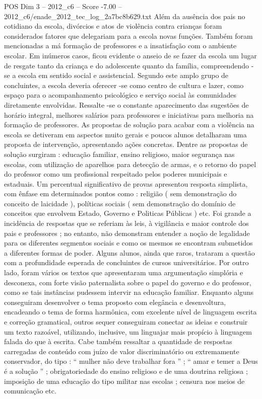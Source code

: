 \begin{textsample}{POS Dim 3 – 2012\_c6 – Score -7.00 – 2012\_c6/enade\_2012\_tec\_log\_2a7bc8b629.txt}
Além da ausência dos pais no cotidiano da escola, divórcios e atos de violência contra crianças foram considerados fatores que delegariam para a escola novas funções.
Também foram mencionadas a má formação de professores e a insatisfação com o ambiente escolar.
Em inúmeros casos, ficou evidente o anseio de se fazer da escola um lugar de resgate tanto da criança e do adolescente quanto da família, compreendendo -se a escola em sentido social e assistencial.
Segundo este amplo grupo de concluintes, a escola deveria oferecer -se como centro de cultura e lazer, como espaço para o acompanhamento psicológico e serviço social às comunidades diretamente envolvidas.
Ressalte -se o constante aparecimento das sugestões de horário integral, melhores salários para professores e iniciativas para melhoria na formação de professores.
As propostas de solução para acabar com a violência na escola se detiveram em aspectos muito gerais e poucos alunos detalharam uma proposta de intervenção, apresentando ações concretas.
Dentre as propostas de solução surgiram : educação familiar, ensino religioso, maior segurança nas escolas, com utilização de aparelhos para detecção de armas, e o retorno do papel do professor como um profissional respeitado pelos poderes municipais e estaduais.
Um percentual significativo de provas apresentou resposta simplista, com ênfase em determinados pontos como : religião ( sem demonstração do conceito de laicidade ), políticas sociais ( sem demonstração do domínio de conceitos que envolvem Estado, Governo e Politicas Públicas ) etc.
Foi grande a incidência de respostas que se referiam às leis, à vigilância e maior controle dos pais e professores ; no entanto, não demonstram entender a noção de legalidade para os diferentes segmentos sociais e como os mesmos se encontram submetidos a diferentes formas de poder.
Alguns alunos, ainda que raros, trataram a questão com a profundidade esperada de concluintes de cursos universitários.
Por outro lado, foram vários os textos que apresentaram uma argumentação simplória e desconexa, com forte visão paternalista sobre o papel do governo e do professor, como se tais instâncias pudessem intervir na educação familiar.
Enquanto alguns conseguiram desenvolver o tema proposto com elegância e desenvoltura, encadeando o tema de forma harmônica, com excelente nível de linguagem escrita e correção gramatical, outros sequer conseguiram conectar as ideias e construir um texto razoável, utilizando, inclusive, um linguajar mais propício à linguagem falada do que à escrita.
Cabe também ressaltar a quantidade de respostas carregadas de conteúdo com juízo de valor discriminatório ou extremamente conservador, do tipo : “ mulher não deve trabalhar fora ” ; “ amar e temer a Deus é a solução ” ; obrigatoriedade do ensino religioso e de uma doutrina religiosa ; imposição de uma educação do tipo militar nas escolas ; censura nos meios de comunicação etc.

\end{textsample}
